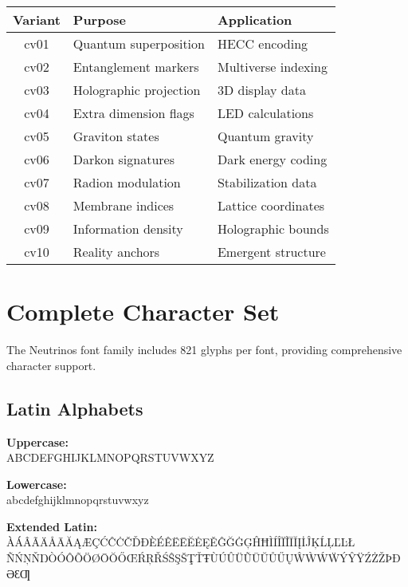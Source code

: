 \documentclass[11pt,letterpaper]{article}
\begin{document}
\begin{center}
\begin{tabular}{cll}
\toprule
\textbf{Variant} & \textbf{Purpose} & \textbf{Application} \\
\midrule
cv01 & Quantum superposition & HECC encoding \\
cv02 & Entanglement markers & Multiverse indexing \\
cv03 & Holographic projection & 3D display data \\
cv04 & Extra dimension flags & LED calculations \\
cv05 & Graviton states & Quantum gravity \\
cv06 & Darkon signatures & Dark energy coding \\
cv07 & Radion modulation & Stabilization data \\
cv08 & Membrane indices & Lattice coordinates \\
cv09 & Information density & Holographic bounds \\
cv10 & Reality anchors & Emergent structure \\
\bottomrule
\end{tabular}
\end{center}

\newpage


\section{Complete Character Set}

The Neutrinos font family includes 821 glyphs per font, providing comprehensive character support.

\subsection{Latin Alphabets}

\textbf{Uppercase:}\\
{\Large ABCDEFGHIJKLMNOPQRSTUVWXYZ}

\textbf{Lowercase:}\\
{\Large abcdefghijklmnopqrstuvwxyz}

\textbf{Extended Latin:}\\
{\large ÀÁÂÃÄÅĀĂĄÆÇĆĈĊČĎÐÈÉÊËĒĔĖĘĚĜĞĠĢĤĦÌÍÎÏĨĪĬĮİĴĶĹĻĽĿŁ}\\
{\large ÑŃŅŇŊÒÓÔÕÖØŌŎŐŒŔŖŘŚŜŞŠŢŤŦÙÚÛÜŨŪŬŮŰŲŴẀẂẄÝŶŸŹŻŽÞĐƏƐƢ}
\end{document}
